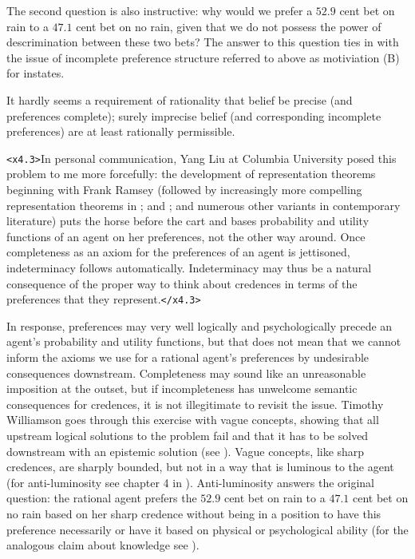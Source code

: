 \documentclass[11pt]{article}
\begin{document}
The second question is also instructive: why would we prefer a $52.9$ cent bet on rain to a $47.1$ cent bet on no rain, given that we do not possess the power of descrimination between these two bets? The answer to this question ties in with the issue of incomplete preference structure referred to above as motiviation (B) for instates.

\begin{quotex}
  It hardly seems a requirement of rationality that belief be precise (and preferences complete); surely imprecise belief (and corresponding incomplete preferences) are at least rationally permissible. 
\end{quotex}

\texttt{<x4.3>}In personal communication, Yang Liu at Columbia University posed this problem to me more forcefully: the development of representation theorems beginning with Frank Ramsey (followed by increasingly more compelling representation theorems in ; and ; and numerous other variants in contemporary literature) puts the horse before the cart and bases probability and utility functions of an agent on her preferences, not the other way around. Once completeness as an axiom for the preferences of an agent is jettisoned, indeterminacy follows automatically. Indeterminacy may thus be a natural consequence of the proper way to think about credences in terms of the preferences that they represent.\texttt{</x4.3>}

In response, preferences may very well logically and psychologically precede an agent's probability and utility functions, but that does not mean that we cannot inform the axioms we use for a rational agent's preferences by undesirable consequences downstream. Completeness may sound like an unreasonable imposition at the outset, but if incompleteness has unwelcome semantic consequences for credences, it is not illegitimate to revisit the issue. Timothy Williamson goes through this exercise with vague concepts, showing that all upstream logical solutions to the problem fail and that it has to be solved downstream with an epistemic solution (see ). Vague concepts, like sharp credences, are sharply bounded, but not in a way that is luminous to the agent (for anti-luminosity see chapter 4 in ). Anti-luminosity answers the original question: the rational agent prefers the $52.9$ cent bet on rain to a $47.1$ cent bet on no rain based on her sharp credence without being in a position to have this preference necessarily or have it based on physical or psychological ability (for the analogous claim about knowledge see ).
\end{document}
